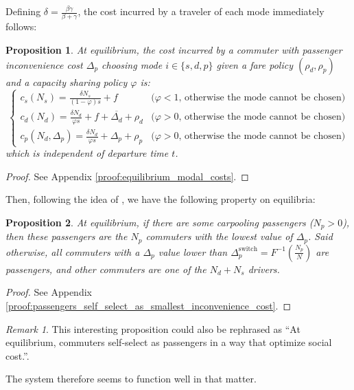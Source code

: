 \documentclass[english, a4paper]{article}
\theoremstyle{plain}
\newtheorem{proposition}{Proposition}
\theoremstyle{definition}
\theoremstyle{remark}
\newtheorem{remark}{Remark}
\begin{document}
Defining $\delta = \frac{\beta\gamma}{\beta + \gamma}$, the cost incurred by a traveler of each mode immediately follows:

\begin{proposition}
    \label{proposition:equilibrium_modal_costs}
    At equilibrium, the cost incurred by a commuter with passenger inconvenience cost $\Delta_p$ choosing mode $i\in \{s, d, p\}$ given a fare policy $(\rho_d, \rho_p)$ and a capacity sharing policy $\varphi$ is:
    \begin{equation}
        \left\{
        \begin{array}{ll}
            c_s(N_s) = \frac{\delta N_s}{(1-\varphi )s} + f & \text{($\varphi < 1$, otherwise the mode cannot be chosen)}\\
            c_d(N_d) = \frac{\delta N_d}{\varphi s} + f + \overline{\Delta _d} + \rho _d & \text{($\varphi > 0$, otherwise the mode cannot be chosen)}\\
            c_p(N_d, \Delta _p) = \frac{\delta N_d}{\varphi s} + \Delta _p + \rho _p & \text{($\varphi > 0$, otherwise the mode cannot be chosen)}
        \end{array} 
        \right.
    \end{equation}
    which is independent of departure time $t$.
\end{proposition}

\begin{proof}
See Appendix \ref{proof:equilibrium_modal_costs}.
\end{proof}

Then, following the idea of \cite{konishi_carpooling_2010}, we have the following property on equilibria:

\begin{proposition}
\label{proposition:passengers_self_select_as_smallest_inconvenience_cost}
    At equilibrium, if there are some carpooling passengers ($N_p > 0$), then these passengers are the $N_p$ commuters with the lowest value of $\Delta_p$. Said otherwise, all commuters with a $\Delta_p$ value lower than $\Delta_p^{\text{switch}} = F^{-1}\left(\frac{N_p}{N}\right)$ are passengers, and other commuters are one of the $N_d + N_s$ drivers.
\end{proposition}

\begin{proof}
    See Appendix \ref{proof:passengers_self_select_as_smallest_inconvenience_cost}.
\end{proof}

\begin{remark}
    This interesting proposition could also be rephrased as ``At equilibrium, commuters self-select as passengers in a way that optimize social cost.''.

    The system therefore seems to function well in that matter.
\end{remark}
\end{document}
